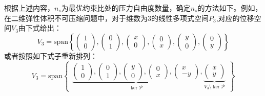 根据上述内容，$n_s$为最优约束比处的压力自由度数量，确定$n_s$的方法如下。例如，在二维弹性体积不可压缩问题中，对于维数为3的线性多项式空间$P_3$,对应的位移空间$V_3$由下式给出：
\begin{equation}
    V_3 = \mathrm{span} \left \{
    \begin{pmatrix} 1 \\ 0 \end{pmatrix},
    \begin{pmatrix} 0 \\ 1 \end{pmatrix},
    \begin{pmatrix} x \\ 0 \end{pmatrix},
    \begin{pmatrix} 0 \\ x \end{pmatrix},
    \begin{pmatrix} y \\ 0 \end{pmatrix},
    \begin{pmatrix} 0 \\ y \end{pmatrix}
    \right \}
\end{equation}
或者按照如下式子重新排列：
\begin{equation}\label{base1}
    V_3 = \mathrm{span} 
    \begin{Bmatrix}
        \underbrace{
        \begin{pmatrix} 1 \\ 0 \end{pmatrix},
        \begin{pmatrix} 0 \\ 1 \end{pmatrix},
        \begin{pmatrix} y \\ 0 \end{pmatrix},
        \begin{pmatrix} 0 \\ x \end{pmatrix},
        \begin{pmatrix} x \\ -y \end{pmatrix}
        }_{\ker \mathcal P},
        \underbrace{
        \begin{pmatrix} x \\ y \end{pmatrix}
        }_{V_3\setminus \ker \mathcal P}
    \end{Bmatrix}
\end{equation}

